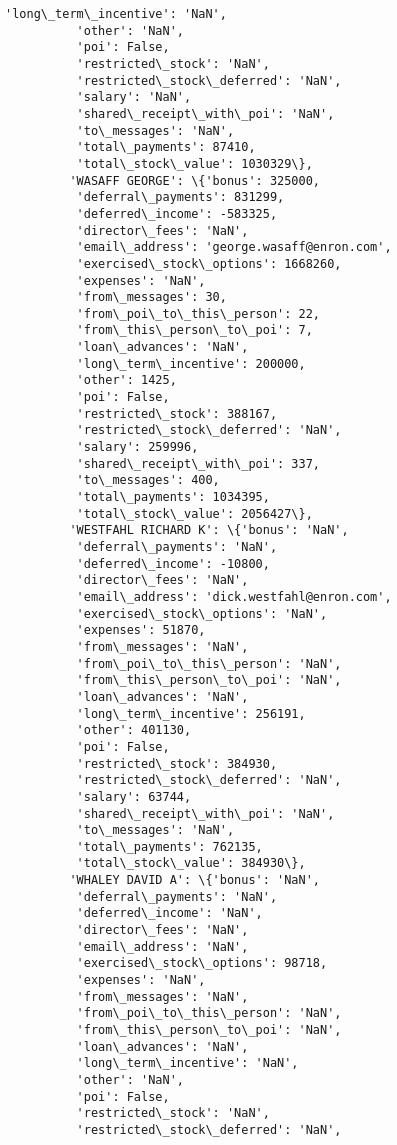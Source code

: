 \documentclass[11pt]{article}
\begin{document}
\begin{Verbatim}[commandchars=\\\{\}]
          'long\_term\_incentive': 'NaN',
          'other': 'NaN',
          'poi': False,
          'restricted\_stock': 'NaN',
          'restricted\_stock\_deferred': 'NaN',
          'salary': 'NaN',
          'shared\_receipt\_with\_poi': 'NaN',
          'to\_messages': 'NaN',
          'total\_payments': 87410,
          'total\_stock\_value': 1030329\},
         'WASAFF GEORGE': \{'bonus': 325000,
          'deferral\_payments': 831299,
          'deferred\_income': -583325,
          'director\_fees': 'NaN',
          'email\_address': 'george.wasaff@enron.com',
          'exercised\_stock\_options': 1668260,
          'expenses': 'NaN',
          'from\_messages': 30,
          'from\_poi\_to\_this\_person': 22,
          'from\_this\_person\_to\_poi': 7,
          'loan\_advances': 'NaN',
          'long\_term\_incentive': 200000,
          'other': 1425,
          'poi': False,
          'restricted\_stock': 388167,
          'restricted\_stock\_deferred': 'NaN',
          'salary': 259996,
          'shared\_receipt\_with\_poi': 337,
          'to\_messages': 400,
          'total\_payments': 1034395,
          'total\_stock\_value': 2056427\},
         'WESTFAHL RICHARD K': \{'bonus': 'NaN',
          'deferral\_payments': 'NaN',
          'deferred\_income': -10800,
          'director\_fees': 'NaN',
          'email\_address': 'dick.westfahl@enron.com',
          'exercised\_stock\_options': 'NaN',
          'expenses': 51870,
          'from\_messages': 'NaN',
          'from\_poi\_to\_this\_person': 'NaN',
          'from\_this\_person\_to\_poi': 'NaN',
          'loan\_advances': 'NaN',
          'long\_term\_incentive': 256191,
          'other': 401130,
          'poi': False,
          'restricted\_stock': 384930,
          'restricted\_stock\_deferred': 'NaN',
          'salary': 63744,
          'shared\_receipt\_with\_poi': 'NaN',
          'to\_messages': 'NaN',
          'total\_payments': 762135,
          'total\_stock\_value': 384930\},
         'WHALEY DAVID A': \{'bonus': 'NaN',
          'deferral\_payments': 'NaN',
          'deferred\_income': 'NaN',
          'director\_fees': 'NaN',
          'email\_address': 'NaN',
          'exercised\_stock\_options': 98718,
          'expenses': 'NaN',
          'from\_messages': 'NaN',
          'from\_poi\_to\_this\_person': 'NaN',
          'from\_this\_person\_to\_poi': 'NaN',
          'loan\_advances': 'NaN',
          'long\_term\_incentive': 'NaN',
          'other': 'NaN',
          'poi': False,
          'restricted\_stock': 'NaN',
          'restricted\_stock\_deferred': 'NaN',

\end{Verbatim}
\end{document}
